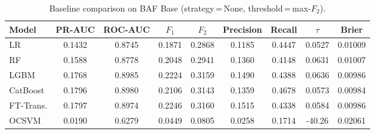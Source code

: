 \begin{table}[ht!]
\centering
\caption{Baseline comparison on BAF Base (strategy\,=\,None, threshold\,=\,max-$F_2$).}
\label{tab:baseline_baf}
\begin{tabular}{l c c c c c c c c}
\toprule
Model & PR-AUC & ROC-AUC & $F_1$ & $F_2$ & Precision & Recall & $\tau$ & Brier \\
\midrule
LR         & 0.1432 & 0.8745 & 0.1871 & 0.2868 & 0.1185 & 0.4447 & 0.0527 & 0.01009 \\
RF         & 0.1588 & 0.8778 & 0.2048 & 0.2941 & 0.1360 & 0.4148 & 0.0631 & 0.01007 \\
LGBM       & 0.1768 & 0.8985 & 0.2224 & 0.3159 & 0.1490 & 0.4388 & 0.0636 & 0.00986 \\
CatBoost   & 0.1796 & 0.8980 & 0.2106 & 0.3143 & 0.1359 & 0.4678 & 0.0573 & 0.00984 \\
FT-Trans.  & 0.1797 & 0.8974 & 0.2246 & 0.3160 & 0.1515 & 0.4338 & 0.0584 & 0.00986 \\
OCSVM      & 0.0190 & 0.6279 & 0.0449 & 0.0805 & 0.0258 & 0.1714 & -40.26 & 0.02061 \\
\bottomrule
\end{tabular}
\end{table}